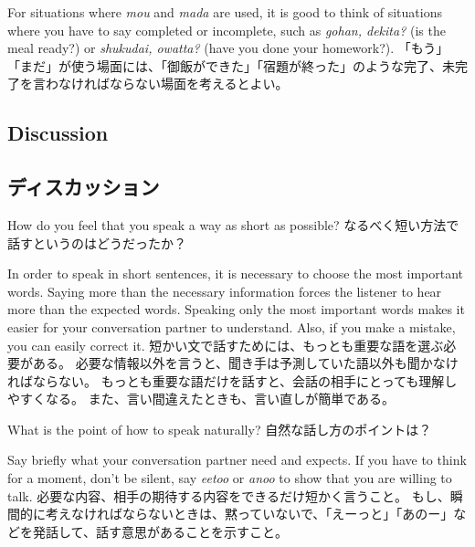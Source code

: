 \documentclass[uplatex,dvipdfmx,b5paper,english,10pt]{jsbook}
\begin{document}
\begin{toianswer}
\ifEnglish
For situations where {\it mou\/} and {\it mada\/} are used, it is good to think of situations where you have to say completed or incomplete, such as {\it gohan, dekita?\/} (is the meal ready?) or {\it shukudai, owatta?\/} (have you done your homework?).
\else
「もう」「まだ」が使う場面には、「御飯ができた」「宿題が終った」のような完了、未完了を言わなければならない場面を考えるとよい。
\fi
\end{toianswer}

\ifEnglish
\subsection{Discussion}
\else
\subsection{ディスカッション}
\fi

\begin{toiquestion}
\ifEnglish
How do you feel that you speak a way as short as possible?
\else
なるべく短い方法で話すというのはどうだったか？
\fi
\end{toiquestion}
\begin{toianswer}
\ifEnglish
In order to speak in short sentences, it is necessary to choose the most important words.
Saying more than the necessary information forces the listener to hear more than the expected words.
Speaking only the most important words makes it easier for your conversation partner to understand.
Also, if you make a mistake, you can easily correct it.
\else
短かい文で話すためには、もっとも重要な語を選ぶ必要がある。
必要な情報以外を言うと、聞き手は予測していた語以外も聞かなければならない。
もっとも重要な語だけを話すと、会話の相手にとっても理解しやすくなる。
また、言い間違えたときも、言い直しが簡単である。
\fi
\end{toianswer}

\begin{toiquestion}
\ifEnglish
What is the point of how to speak naturally?
\else
自然な話し方のポイントは？
\fi
\end{toiquestion}
\begin{toianswer}
\ifEnglish
Say briefly what your conversation partner need and expects.
If you have to think for a moment, don't be silent, say {\it eetoo\/} or {\it anoo\/} to show that you are willing to talk.
\else
必要な内容、相手の期待する内容をできるだけ短かく言うこと。
もし、瞬間的に考えなければならないときは、黙っていないで、「えーっと」「あのー」などを発話して、話す意思があることを示すこと。
\fi
\end{toianswer}
\end{document}
